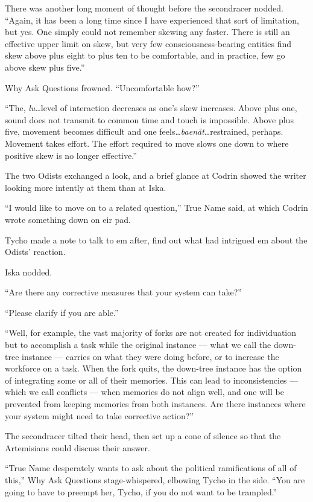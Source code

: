 There was another long moment of thought before the secondracer nodded. ``Again, it has been a long time since I have experienced that sort of limitation, but yes. One simply could not remember skewing any faster. There is still an effective upper limit on skew, but very few consciousness-bearing entities find skew above plus eight to plus ten to be comfortable, and in practice, few go above skew plus five.''

Why Ask Questions frowned. ``Uncomfortable how?''

``The, \emph{lu}\ldots level of interaction decreases as one's skew increases. Above plus one, sound does not transmit to common time and touch is impossible. Above plus five, movement becomes difficult and one feels\ldots{}\emph{baenåt}\ldots restrained, perhaps. Movement takes effort. The effort required to move slows one down to where positive skew is no longer effective.''

The two Odists exchanged a look, and a brief glance at Codrin showed the writer looking more intently at them than at Iska.

``I would like to move on to a related question,'' True Name said, at which Codrin wrote something down on eir pad.

Tycho made a note to talk to em after, find out what had intrigued em about the Odists' reaction.

Iska nodded.

``Are there any corrective measures that your system can take?''

``Please clarify if you are able.''

``Well, for example, the vast majority of forks are not created for individuation but to accomplish a task while the original instance — what we call the down-tree instance — carries on what they were doing before, or to increase the workforce on a task. When the fork quits, the down-tree instance has the option of integrating some or all of their memories. This can lead to inconsistencies — which we call conflicts — when memories do not align well, and one will be prevented from keeping memories from both instances. Are there instances where your system might need to take corrective action?''

The secondracer tilted their head, then set up a cone of silence so that the Artemisians could discuss their answer.

``True Name desperately wants to ask about the political ramifications of all of this,'' Why Ask Questions stage-whispered, elbowing Tycho in the side. ``You are going to have to preempt her, Tycho, if you do not want to be trampled.''

